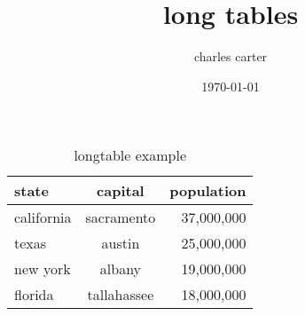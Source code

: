\documentclass{article}
\title{long tables}
\author{charles carter}
\date{\today{}}
\begin{document}
 
    \maketitle{}
    \listoftables{}
        \begin{longtable}{| l | c | r | }
            \caption{longtable example}
            \label{longtable}
            \hline
            state & capital & population \\
            \hline
            \hline
            california & sacramento & 37,000,000 \\
            \hline
            texas & austin  & 25,000,000 \\
            \hline
            new york & albany & 19,000,000 \\
            \hline
            florida & tallahassee  & 18,000,000 \\
            \hline
        \end{longtable}
\end{document}
